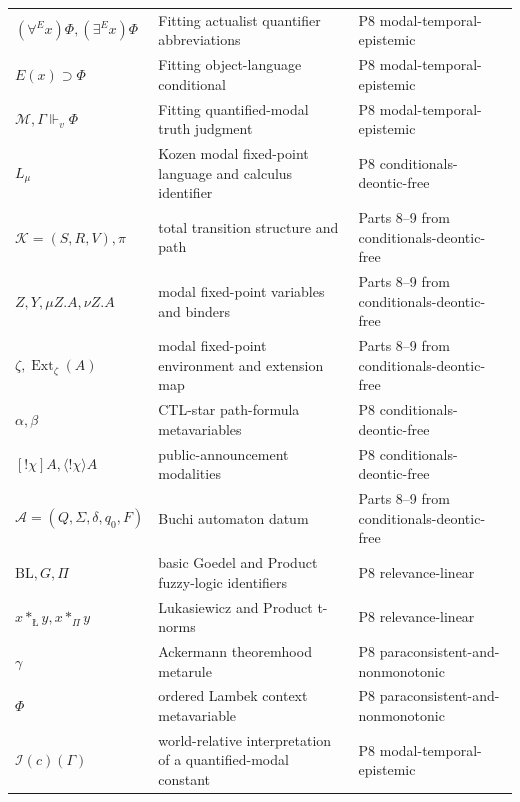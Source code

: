 \begin{longtable}{@{}p{}p{}p{}@{}}
\((\forall^E x)\Phi,\allowbreak (\exists^E x)\Phi\) & Fitting actualist quantifier abbreviations & P8 modal-\allowbreak{}temporal-\allowbreak{}epistemic \\
\(E(x)\supset\Phi\) & Fitting object-language conditional & P8 modal-\allowbreak{}temporal-\allowbreak{}epistemic \\
\(\mathcal M,\allowbreak \Gamma\Vdash_v\Phi\) & Fitting quantified-modal truth judgment & P8 modal-\allowbreak{}temporal-\allowbreak{}epistemic \\
\(L_{\mu}\) & Kozen modal fixed-point language and calculus identifier & P8 conditionals-\allowbreak{}deontic-\allowbreak{}free \\
\(\mathcal K=(S,\allowbreak R,\allowbreak V),\allowbreak \pi\) & total transition structure and path & Parts 8--9 from conditionals-\allowbreak{}deontic-\allowbreak{}free \\
\(Z,\allowbreak Y,\allowbreak \mu Z.A,\allowbreak \nu Z.A\) & modal fixed-point variables and binders & Parts 8--9 from conditionals-\allowbreak{}deontic-\allowbreak{}free \\
\(\zeta,\allowbreak \operatorname{Ext}_{\zeta}(A)\) & modal fixed-point environment and extension map & Parts 8--9 from conditionals-\allowbreak{}deontic-\allowbreak{}free \\
\(\alpha,\allowbreak \beta\) & CTL-star path-formula metavariables & P8 conditionals-\allowbreak{}deontic-\allowbreak{}free \\
\([!\chi]A,\allowbreak \langle!\chi\rangle A\) & public-announcement modalities & P8 conditionals-\allowbreak{}deontic-\allowbreak{}free \\
\(\mathcal A=(Q,\allowbreak \Sigma,\allowbreak \delta,\allowbreak q_0,\allowbreak F)\) & Buchi automaton datum & Parts 8--9 from conditionals-\allowbreak{}deontic-\allowbreak{}free \\
\(\mathrm{BL},\allowbreak G,\allowbreak \Pi\) & basic Goedel and Product fuzzy-logic identifiers & P8 relevance-\allowbreak{}linear \\
\(x\mathbin{\ast_{\text{\L}}}y,\allowbreak x\mathbin{\ast_{\Pi}}y\) & Lukasiewicz and Product t-norms & P8 relevance-\allowbreak{}linear \\
\(\gamma\) & Ackermann theoremhood metarule & P8 paraconsistent-\allowbreak{}and-\allowbreak{}nonmonotonic \\
\(\Phi\) & ordered Lambek context metavariable & P8 paraconsistent-\allowbreak{}and-\allowbreak{}nonmonotonic \\
\(\mathcal I(c)(\Gamma)\) & world-relative interpretation of a quantified-modal constant & P8 modal-\allowbreak{}temporal-\allowbreak{}epistemic \\

\end{longtable}
